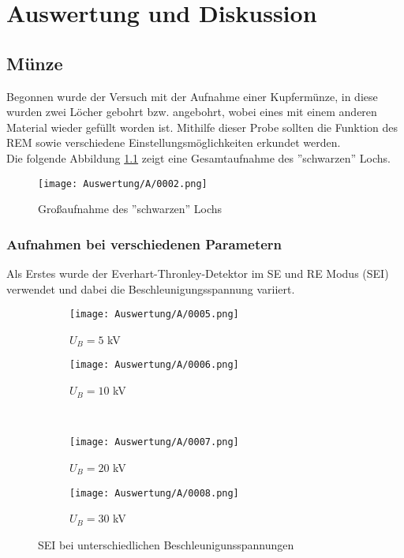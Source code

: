 
\chapter{Auswertung und Diskussion}
\label{chap:versuchsauswertung}

\section{Münze}
Begonnen wurde der Versuch mit der Aufnahme einer Kupfermünze, in diese wurden zwei Löcher gebohrt bzw. angebohrt, wobei eines mit einem anderen Material wieder gefüllt worden ist. Mithilfe dieser Probe sollten die Funktion des REM sowie verschiedene Einstellungsmöglichkeiten erkundet werden.\\
Die folgende Abbildung \ref{fig:GsL} zeigt eine Gesamtaufnahme des ''schwarzen'' Lochs.

\begin{figure}[h]
    \centering
    \texttt{[image: Auswertung/A/0002.png]}
    \caption{Großaufnahme des ''schwarzen'' Lochs}
    \label{fig:GsL}
\end{figure}

\newpage
\subsection{Aufnahmen bei verschiedenen Parametern}
\label{subsec:Bs}
Als Erstes wurde der Everhart-Thronley-Detektor im SE und RE Modus (SEI) verwendet und dabei die Beschleunigungsspannung variiert.

\begin{figure}[h]
    \centering
    
    \begin{subfigure}[b]{0.45\textwidth}
        \centering
        \texttt{[image: Auswertung/A/0005.png]}
        \caption{$U_B = 5$ kV}
    \end{subfigure}
    \hfill
    \begin{subfigure}[b]{0.45\textwidth}
        \centering
        \texttt{[image: Auswertung/A/0006.png]}
        \caption{$U_B = 10$ kV}
    \end{subfigure}
    \\
    \begin{subfigure}[b]{0.45\textwidth}
        \centering
        \texttt{[image: Auswertung/A/0007.png]}
        \caption{$U_B = 20$ kV}
    \end{subfigure}
    \hfill
    \begin{subfigure}[b]{0.45\textwidth}
        \centering
        \texttt{[image: Auswertung/A/0008.png]}
        \caption{$U_B = 30$ kV}
    \end{subfigure}
    \caption{SEI bei unterschiedlichen Beschleunigunsspannungen}
\end{figure}

